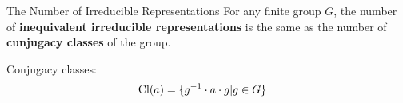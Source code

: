 %
%    
%    
%
%
%    
%

\begin{frame}{The Number of Irreducible Representations}
    For any finite group $G$, the number of \textbf{inequivalent irreducible representations} is the same as the number of \textbf{cunjugacy classes} of the group.

    {\hspace*{\fill} \cite{fulton2013}}
    
    \pause
    \vspace{1em}
    Conjugacy classes:
    \begin{align*}
        \operatorname{Cl}(a) & = \{g^{-1} \cdot a \cdot g | g \in G \}
    \end{align*}
\end{frame}

